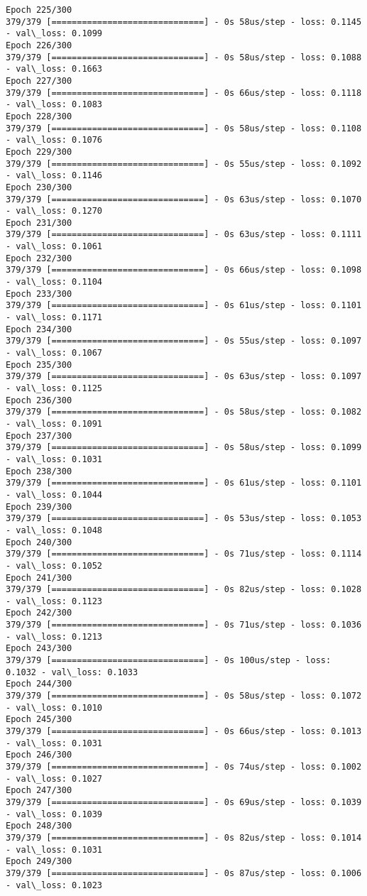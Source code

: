 \documentclass[11pt]{article}
\begin{document}
\begin{Verbatim}[commandchars=\\\{\}]
Epoch 225/300
379/379 [==============================] - 0s 58us/step - loss: 0.1145 - val\_loss: 0.1099
Epoch 226/300
379/379 [==============================] - 0s 58us/step - loss: 0.1088 - val\_loss: 0.1663
Epoch 227/300
379/379 [==============================] - 0s 66us/step - loss: 0.1118 - val\_loss: 0.1083
Epoch 228/300
379/379 [==============================] - 0s 58us/step - loss: 0.1108 - val\_loss: 0.1076
Epoch 229/300
379/379 [==============================] - 0s 55us/step - loss: 0.1092 - val\_loss: 0.1146
Epoch 230/300
379/379 [==============================] - 0s 63us/step - loss: 0.1070 - val\_loss: 0.1270
Epoch 231/300
379/379 [==============================] - 0s 63us/step - loss: 0.1111 - val\_loss: 0.1061
Epoch 232/300
379/379 [==============================] - 0s 66us/step - loss: 0.1098 - val\_loss: 0.1104
Epoch 233/300
379/379 [==============================] - 0s 61us/step - loss: 0.1101 - val\_loss: 0.1171
Epoch 234/300
379/379 [==============================] - 0s 55us/step - loss: 0.1097 - val\_loss: 0.1067
Epoch 235/300
379/379 [==============================] - 0s 63us/step - loss: 0.1097 - val\_loss: 0.1125
Epoch 236/300
379/379 [==============================] - 0s 58us/step - loss: 0.1082 - val\_loss: 0.1091
Epoch 237/300
379/379 [==============================] - 0s 58us/step - loss: 0.1099 - val\_loss: 0.1031
Epoch 238/300
379/379 [==============================] - 0s 61us/step - loss: 0.1101 - val\_loss: 0.1044
Epoch 239/300
379/379 [==============================] - 0s 53us/step - loss: 0.1053 - val\_loss: 0.1048
Epoch 240/300
379/379 [==============================] - 0s 71us/step - loss: 0.1114 - val\_loss: 0.1052
Epoch 241/300
379/379 [==============================] - 0s 82us/step - loss: 0.1028 - val\_loss: 0.1123
Epoch 242/300
379/379 [==============================] - 0s 71us/step - loss: 0.1036 - val\_loss: 0.1213
Epoch 243/300
379/379 [==============================] - 0s 100us/step - loss: 0.1032 - val\_loss: 0.1033
Epoch 244/300
379/379 [==============================] - 0s 58us/step - loss: 0.1072 - val\_loss: 0.1010
Epoch 245/300
379/379 [==============================] - 0s 66us/step - loss: 0.1013 - val\_loss: 0.1031
Epoch 246/300
379/379 [==============================] - 0s 74us/step - loss: 0.1002 - val\_loss: 0.1027
Epoch 247/300
379/379 [==============================] - 0s 69us/step - loss: 0.1039 - val\_loss: 0.1039
Epoch 248/300
379/379 [==============================] - 0s 82us/step - loss: 0.1014 - val\_loss: 0.1031
Epoch 249/300
379/379 [==============================] - 0s 87us/step - loss: 0.1006 - val\_loss: 0.1023

\end{Verbatim}
\end{document}
